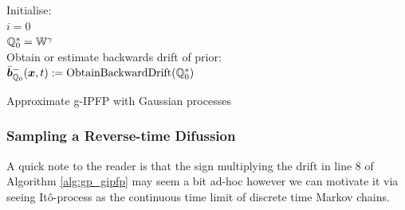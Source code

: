 \documentclass[a4paper,12pt,twoside,openright]{report}
\theoremstyle{definition}
\begin{document}
\begin{algorithm} \label{alg:gp_gipfp}
Initialise:\\
$i=0$ \\
${\mathbb{Q}}^{*}_0 =\mathbb{W}^{\gamma}$\\
Obtain or estimate backwards drift of prior: \\
$\bar{{\bm{b}}}^{-}_{{\mathbb{Q}}_{0}}({\bm{x}}, t) := \text{ObtainBackwardDrift}({\mathbb{Q}}^{*}_0)$\\

\caption{ Approximate g-IPFP with Gaussian processes   }
\end{algorithm}



\subsubsection{Sampling a Reverse-time Difussion }
A quick note to the reader is that the sign multiplying the drift in line $8$ of Algorithm \ref{alg:gp_gipfp} may seem a bit ad-hoc however we can motivate it via seeing Itô-process as the continuous time limit of discrete time Markov chains.
\end{document}

